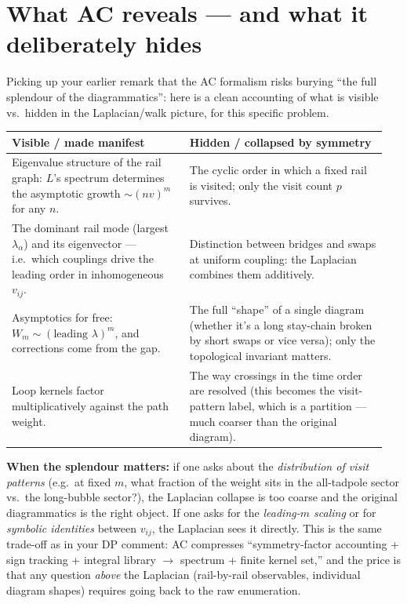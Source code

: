 \documentclass[11pt,a4paper]{article}
\begin{document}
\section{What AC reveals --- and what it deliberately hides}

Picking up your earlier remark that the AC formalism risks burying ``the full
splendour of the diagrammatics'': here is a clean accounting of what is
visible vs.\ hidden in the Laplacian/walk picture, for this specific problem.

\begin{center}
\renewcommand{\arraystretch}{1.25}
\begin{tabular}{p{0.45\linewidth}p{0.5\linewidth}}
\toprule
\textbf{Visible / made manifest} & \textbf{Hidden / collapsed by symmetry} \\
\midrule
Eigenvalue structure of the rail graph: $L$'s spectrum determines the
asymptotic growth $\sim (nv)^m$ for any $n$. &
The cyclic order in which a fixed rail is visited; only the visit count $p$
survives. \\
\addlinespace
The dominant rail mode (largest $\lambda_\alpha$) and its eigenvector ---
i.e.\ which couplings drive the leading order in inhomogeneous $v_{ij}$. &
Distinction between bridges and swaps at uniform coupling: the Laplacian
combines them additively. \\
\addlinespace
Asymptotics for free: $W_m \sim (\text{leading }\lambda)^m$, and corrections
come from the gap. &
The full ``shape'' of a single diagram (whether it's a long stay-chain
broken by short swaps or vice versa); only the topological invariant matters. \\
\addlinespace
Loop kernels factor multiplicatively against the path weight. &
The way crossings in the time order are resolved (this becomes the
visit-pattern label, which is a partition --- much coarser than the original
diagram). \\
\bottomrule
\end{tabular}
\end{center}

\noindent\textbf{When the splendour matters:} if one asks about the
\emph{distribution of visit patterns} (e.g.\ at fixed $m$, what fraction of
the weight sits in the all-tadpole sector vs.\ the long-bubble sector?), the
Laplacian collapse is too coarse and the original diagrammatics is the right
object. If one asks for the \emph{leading-$m$ scaling} or for
\emph{symbolic identities} between $v_{ij}$, the Laplacian sees it directly.
This is the same trade-off as in your DP comment: AC compresses
``symmetry-factor accounting + sign tracking + integral library $\to$
spectrum + finite kernel set,'' and the price is that any question
\emph{above} the Laplacian (rail-by-rail observables, individual diagram
shapes) requires going back to the raw enumeration.
\end{document}
